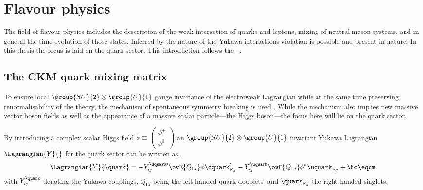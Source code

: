 
\section{Flavour physics}
\label{sec:cpv_theory:flavour_physics}

The field of flavour physics includes the description of the weak interaction of
quarks and leptons, mixing of neutral meson systems, and in general the time
evolution of those states. Inferred by the nature of the Yukawa interactions \CP
violation is possible and present in nature. In this thesis the focus is laid on
the quark sector. This introduction follows the
\Refs~\cite{Branco:1999fs,Bigi:2000yz,Agashe:2014kda}.

\subsection{The \acs{CKM} quark mixing matrix}
\label{sec:cpv_theory:flavour_physics:ckm_matrix}

To ensure local $\group{SU}{2}\otimes\group{U}{1}$ gauge invariance of the
electroweak Lagrangian while at the same time preserving renormalisability of
the theory, the mechanism of spontaneous symmetry breaking is used
\cite{set:higgs}. While the mechanism also implies new massive vector boson
fields as well as the appearance of a massive scalar particle---the Higgs
boson---the focus here will lie on the quark sector.

By introducing a complex scalar Higgs field $\phi \equiv
\left(\begin{smallmatrix} \phi ^{+} \\ \phi^{0}\end{smallmatrix}\right)$ an
$\group{SU}{2}\otimes\group{U}{1}$ invariant Yukawa Lagrangian
$\Lagrangian{Y}{}$ for the quark sector can be written as,
%
\begin{equation}\label{sec:cpv_theory:flavour_physics:ckm_matrix:yukawa_lagrangian}
  \Lagrangian{Y}{\quark} = -Y_{ij}^{\dquark\prime} \ovE{Q_{\text{L}i}} \phi \dquark_{\text{R}j}^{\prime} - Y_{ij}^{\uquark} \ovE{Q_{\text{L}i}} \phi^{\ast} \uquark_{\text{R}j} + \hc \eqcm
\end{equation}
%
with $Y_{ij}^{\quark}$ denoting the Yukawa couplings, $Q_{\text{L}i}$ being the
left-handed quark doublets, and $\quark_{\text{R}j}$ the right-handed singlets. 

